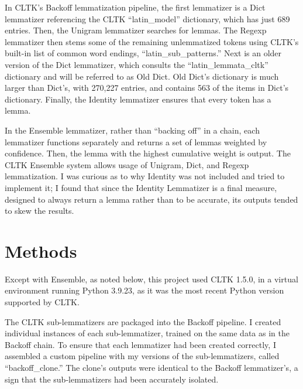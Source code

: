 \documentclass[11pt]{article}
\begin{document}
In CLTK’s Backoff lemmatization pipeline, the first lemmatizer is a Dict lemmatizer referencing the CLTK “latin\_model” dictionary, which has just 689 entries. Then, the Unigram lemmatizer searches for lemmas. The Regexp lemmatizer then stems some of the remaining unlemmatized tokens using CLTK’s built-in list of common word endings, “latin\_sub\_patterns.” Next is an older version of the Dict lemmatizer, which consults the “latin\_lemmata\_cltk” dictionary and will be referred to as Old Dict. Old Dict’s dictionary is much larger than Dict’s, with 270,227 entries, and contains 563 of the items in Dict’s dictionary. Finally, the Identity lemmatizer ensures that every token has a lemma.

In the Ensemble lemmatizer, rather than “backing off” in a chain, each lemmatizer functions separately and returns a set of lemmas weighted by confidence. Then, the lemma with the highest cumulative weight is output. The CLTK Ensemble system allows usage of Unigram, Dict, and Regexp lemmatization. I was curious as to why Identity was not included and tried to implement it; I found that since the Identity Lemmatizer is a final measure, designed to always return a lemma rather than to be accurate, its outputs tended to skew the results. 

\section{Methods}

Except with Ensemble, as noted below, this project used CLTK 1.5.0, in a virtual environment running Python 3.9.23, as it was the most recent Python version supported by CLTK.

The CLTK sub-lemmatizers are packaged into the Backoff pipeline. I created individual instances of each sub-lemmatizer, trained on the same data as in the Backoff chain. To ensure that each lemmatizer had been created correctly, I assembled a custom pipeline with my versions of the sub-lemmatizers, called “backoff\_clone.” The clone’s outputs were identical to the Backoff lemmatizer’s, a sign that the sub-lemmatizers had been accurately isolated.
\end{document}
